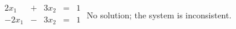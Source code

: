{$\begin{array}{ccccc}
2x_1&+&3x_2&=&1\\
-2x_1&-&3x_2&=&1\\
\end{array}$}
{No solution; the system is inconsistent.}